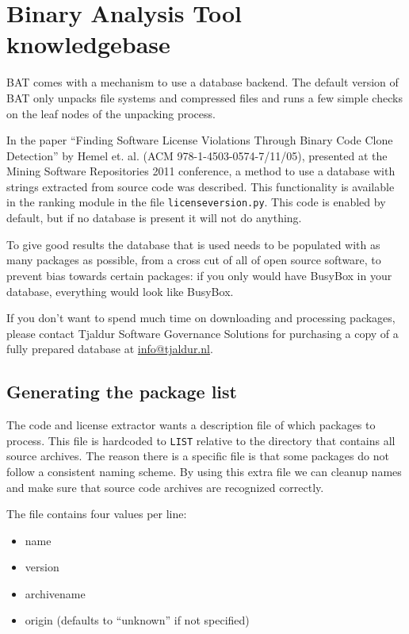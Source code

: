 \documentclass[10pt,a4paper]{article}
\begin{document}
\section{Binary Analysis Tool knowledgebase}

BAT comes with a mechanism to use a database backend. The default version of
BAT only unpacks file systems and compressed files and runs a few simple checks
on the leaf nodes of the unpacking process.

In the paper ``Finding Software License Violations Through Binary Code Clone
Detection'' by Hemel et. al. (ACM 978-1-4503-0574-7/11/05), presented at
the Mining Software Repositories 2011 conference, a method to use a database
with strings extracted from source code was described. This functionality is
available in the ranking module in the file \texttt{licenseversion.py}. This
code is enabled by default, but if no database is present it will not do
anything.

To give good results the database that is used needs to be populated with as
many packages as possible, from a cross cut of all of open source software, to
prevent bias towards certain packages: if you only would have BusyBox in your
database, everything would look like BusyBox.

If you don't want to spend much time on downloading and processing
packages, please contact Tjaldur Software Governance Solutions for
purchasing a copy of a fully prepared database at \url{info@tjaldur.nl}.

\subsection{Generating the package list}

The code and license extractor wants a description file of which packages to
process. This file is hardcoded to \texttt{LIST} relative to the directory that
contains all source archives. The reason there is a specific file is that some
packages do not follow a consistent naming scheme. By using this extra file we
can cleanup names and make sure that source code archives are recognized
correctly.

The file contains four values per line:

\begin{itemize}
\item name
\item version
\item archivename
\item origin (defaults to ``unknown'' if not specified)
\end{itemize}
\end{document}
